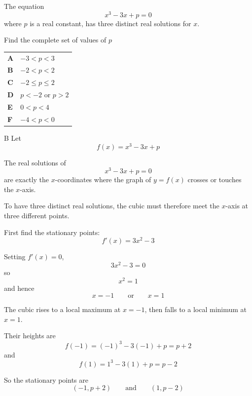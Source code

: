 \documentclass[11pt,a4paper]{article}
\begin{document}
\begin{enumerate}[label=\textbf{\arabic*.},leftmargin=*,itemsep=0pt,start=20]
\questionitem[Polynomials]
The equation \[x^3 - 3x + p = 0\] where $p$ is a real constant, has three distinct real solutions for $x$.

Find the complete set of values of $p$

\par\vspace*{12pt}
\begin{tabularx}{\linewidth}{@{}>{\bfseries}l Y@{}}
A &
$-3 < p < 3$
\\[0.8em]
B &
$-2 < p < 2$
\\[0.8em]
C &
$-2 \le p \le 2$
\\[0.8em]
D &
$p < -2$ or $p > 2$
\\[0.8em]
E &
$0 < p < 4$
\\[0.8em]
F &
$-4 < p < 0$
\\
\end{tabularx}

\begin{djsSolution}{B}
Let
\[
f(x)=x^3-3x+p
\]

The real solutions of
\[
x^3-3x+p=0
\]
are exactly the \(x\)-coordinates where the graph of \(y=f(x)\) crosses or touches the \(x\)-axis.

To have three distinct real solutions, the cubic must therefore meet the \(x\)-axis at three different points.

First find the stationary points:
\[
f'(x)=3x^2-3
\]

Setting \(f'(x)=0\),
\[
3x^2-3=0
\]
so
\[
x^2=1
\]
and hence
\[
x=-1
\qquad\text{or}\qquad
x=1
\]

The cubic rises to a local maximum at \(x=-1\), then falls to a local minimum at \(x=1\).

Their heights are
\[
f(-1)=(-1)^3-3(-1)+p=p+2
\]
and
\[
f(1)=1^3-3(1)+p=p-2
\]

So the stationary points are
\[
(-1,p+2)
\qquad\text{and}\qquad
(1,p-2)
\]


\end{djsSolution}
\end{enumerate}
\end{document}

